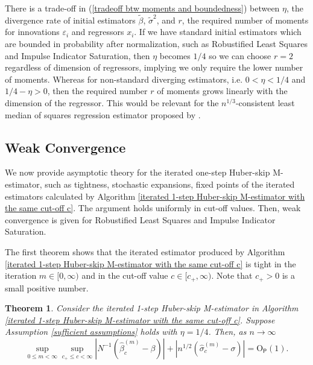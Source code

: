 \documentclass[11pt, letterpaper]{article}
\newtheorem{theorem}{Theorem}
\numberwithin{algorithm}{section}
\numberwithin{assumption}{section}
\numberwithin{lemma}{section}
\numberwithin{theorem}{section}
\numberwithin{corollary}{section}
\numberwithin{remark}{section}
\numberwithin{equation}{section}
\numberwithin{figure}{section}
\numberwithin{table}{section}
\begin{document}
There is a trade-off in (\ref{tradeoff btw moments and boundedness}) between $\eta$, the divergence rate of initial estimators $\widetilde{\beta}$, $\widetilde{\sigma}^{2}$, and $r$, the required number of moments for innovations $\varepsilon_{i}$ and regressors $x_{i}$. If we have standard initial estimators which are bounded in probability after normalization, such as Robustified Least Squares and Impulse Indicator Saturation, then $\eta$ becomes $1/4$ so we can choose $r = 2$ regardless of dimension of regressors, implying we only require the lower number of moments. Whereas for non-standard diverging estimators, i.e. $0 < \eta < 1/4$ and $1/4 - \eta > 0$, then the required number $r$ of moments grows linearly with the dimension of the regressor. This would be relevant for the $n^{1/3}$-consistent least median of squares regression estimator proposed by \cite{rousseeuw1984least}.


\subsection{Weak Convergence} \label{sec_weak convergence}
We now provide asymptotic theory for the iterated one-step Huber-skip M-estimator, such as tightness, stochastic expansions, fixed points of the iterated estimators calculated by Algorithm \ref{iterated 1-step Huber-skip M-estimator with the same cut-off c}. The argument holds uniformly in cut-off values. Then, weak convergence is given for Robustified Least Squares and Impulse Indicator Saturation.

The first theorem shows that the iterated estimator produced by Algorithm \ref{iterated 1-step Huber-skip M-estimator with the same cut-off c} is tight in the iteration $m \in [0, \infty)$ and in the cut-off value $c \in [c_{+}, \infty)$. Note that $c_{+} > 0$ is a small positive number.

\begin{theorem} \label{tightness of iterated estimators}
Consider the iterated 1-step Huber-skip M-estimator in Algorithm \ref{iterated 1-step Huber-skip M-estimator with the same cut-off c}. Suppose Assumption \ref{sufficient assumptions} holds with $\eta = 1/4$. Then, as $n \to \infty$
\begin{equation*}
\sup_{0 \le m < \infty} \sup_{c_{+} \le c < \infty} |N^{-1} (\widehat{\beta}_{c}^{(m)} - \beta)| + |n^{1/2} (\widehat{\sigma}_{c}^{(m)} - \sigma)| = \mathrm{O}_{\mathsf{P}}(1).
\end{equation*}
\end{theorem}
\end{document}
